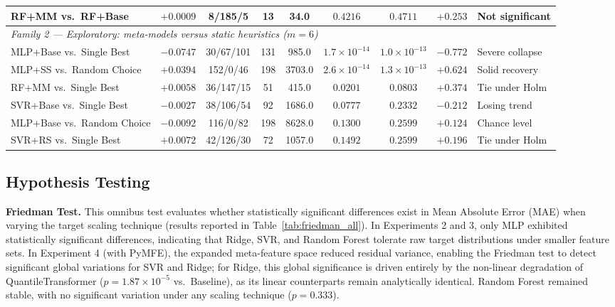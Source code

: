 \documentclass[12pt]{article}
\begin{document}
\begin{table}[ht]
{\begin{tabular}{lcccccccl}
RF+MM vs.\ RF+Base       & $+0.0009$ & 8/185/5   & 13  & 34.0   & $0.4216$              & $0.4711$              & $+0.253$ & Not significant \\
\midrule
\multicolumn{9}{l}{\textit{Family 2 --- Exploratory: meta-models versus static heuristics ($m = 6$)}} \\
\midrule
MLP+Base vs.\ Single Best   & $-0.0747$ & 30/67/101  & 131 & 985.0  & $1.7 \times 10^{-14}$ & $1.0 \times 10^{-13}$ & $-0.772$ & Severe collapse \\
MLP+SS vs.\ Random Choice   & $+0.0394$ & 152/0/46   & 198 & 3703.0 & $2.6 \times 10^{-14}$ & $1.3 \times 10^{-13}$ & $+0.624$ & Solid recovery \\
RF+MM vs.\ Single Best      & $+0.0058$ & 36/147/15  & 51  & 415.0  & $0.0201$              & $0.0803$              & $+0.374$ & Tie under Holm \\
SVR+Base vs.\ Single Best   & $-0.0027$ & 38/106/54  & 92  & 1686.0 & $0.0777$              & $0.2332$              & $-0.212$ & Losing trend \\
MLP+Base vs.\ Random Choice & $-0.0092$ & 116/0/82   & 198 & 8628.0 & $0.1300$              & $0.2599$              & $+0.124$ & Chance level \\
SVR+RS vs.\ Single Best     & $+0.0072$ & 42/126/30  & 72  & 1057.0 & $0.1492$              & $0.2599$              & $+0.196$ & Tie under Holm \\
\bottomrule
\end{tabular}%
}
\end{table}

\subsection{Hypothesis Testing}

\textbf{Friedman Test.} This omnibus test evaluates whether statistically significant differences exist in Mean Absolute Error (MAE) when varying the target scaling technique (results reported in Table~\ref{tab:friedman_all}). In Experiments 2 and 3, only MLP exhibited statistically significant differences, indicating that Ridge, SVR, and Random Forest tolerate raw target distributions under smaller feature sets. In Experiment 4 (with PyMFE), the expanded meta-feature space reduced residual variance, enabling the Friedman test to detect significant global variations for SVR and Ridge; for Ridge, this global significance is driven entirely by the non-linear degradation of QuantileTransformer ($p = 1.87 \times 10^{-5}$ vs.\ Baseline), as its linear counterparts remain analytically identical. Random Forest remained stable, with no significant variation under any scaling technique ($p = 0.333$).
\end{document}
